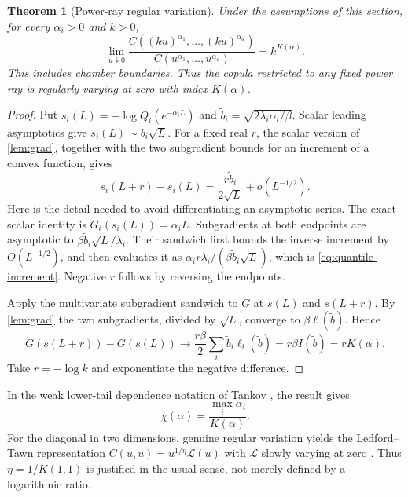 \documentclass[11pt,a4paper]{article}
\newtheorem{theorem}{Theorem}[section]
\theoremstyle{definition}
\theoremstyle{remark}
\numberwithin{equation}{section}
\begin{document}
\begin{theorem}[Power-ray regular variation]
\label{thm:RV}
Under the assumptions of this section, for every $\alpha_i>0$ and $k>0$,
\begin{equation}
 \lim_{u\downarrow0}
 \frac{C((ku)^{\alpha_1},\ldots,(ku)^{\alpha_d})}
      {C(u^{\alpha_1},\ldots,u^{\alpha_d})}
 =k^{K(\alpha)}.
 \label{eq:RV}
\end{equation}
This includes chamber boundaries. Thus the copula restricted to any fixed
power ray is regularly varying at zero with index $K(\alpha)$.
\end{theorem}
\begin{proof}
Put $s_i(L)=-\log Q_i(e^{-\alpha_iL})$ and
$\widetilde b_i=\sqrt{2\lambda_i\alpha_i/\beta}$. Scalar leading
asymptotics give $s_i(L)\sim\widetilde b_i\sqrt L$. For a fixed real
$r$, the scalar version of \cref{lem:grad}, together with the two
subgradient bounds for an increment of a convex function, gives
\begin{equation}
 s_i(L+r)-s_i(L)=\frac{r\widetilde b_i}{2\sqrt L}+o(L^{-1/2}).
 \label{eq:quantile-increment}
\end{equation}
Here is the detail needed to avoid differentiating an asymptotic series.
The exact scalar identity is $G_i(s_i(L))=\alpha_iL$. Subgradients at
both endpoints are asymptotic to
$\beta\widetilde b_i\sqrt L/\lambda_i$. Their sandwich first bounds
the inverse increment by $O(L^{-1/2})$, and then evaluates it as
$\alpha_i r\lambda_i/(\beta\widetilde b_i\sqrt L)$, which is
\eqref{eq:quantile-increment}. Negative $r$ follows by reversing the
endpoints.

Apply the multivariate subgradient sandwich to $G$ at $s(L)$ and
$s(L+r)$. By \cref{lem:grad} the two subgradients, divided by $\sqrt L$,
converge to $\beta\ell(\widetilde b)$. Hence
\[
 G(s(L+r))-G(s(L))\longrightarrow
 \frac{r\beta}{2}\sum_i\widetilde b_i\ell_i(\widetilde b)
 =r\beta I(\widetilde b)=rK(\alpha).
\]
Take $r=-\log k$ and exponentiate the negative difference.
\end{proof}

In the weak lower-tail dependence notation of Tankov \cite{Tankov}, the
result gives
\begin{equation}
 \chi(\alpha)=\frac{\max_i\alpha_i}{K(\alpha)}.
 \label{eq:weak-function}
\end{equation}
For the diagonal in two dimensions, genuine regular variation yields the
Ledford--Tawn representation
$C(u,u)=u^{1/\eta}\mathcal L(u)$ with $\mathcal L$ slowly varying at
zero \cite{LedfordTawn}. Thus $\eta=1/K(1,1)$ is justified in the usual
sense, not merely defined by a logarithmic ratio.
\end{document}
